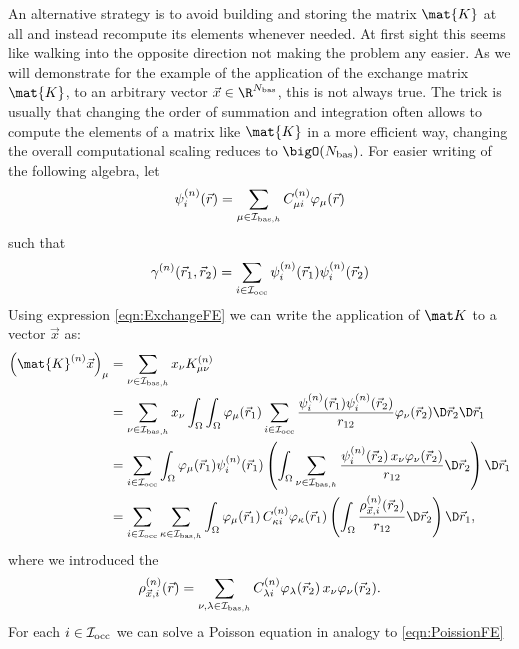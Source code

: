 An alternative strategy
is to avoid building and storing the matrix $\mat{K}$ at all
and instead recompute its elements whenever needed.
At first sight this seems like walking into the opposite direction
not making the problem any easier.
As we will demonstrate for the example
of the application of the exchange matrix $\mat{K}$,
to an arbitrary vector $\vec{x} \in \R^{\Nbas}$,
this is not always true.
The trick is usually that changing the order of summation and integration
often allows to compute the elements of a matrix like $\mat{K}$
in a more efficient way,
changing the overall computational scaling reduces to $\bigO(\Nbas)$.
For easier writing of the following algebra, let
\[ \psi_i^{(n)}(\vec{r}) = \sum_{\mu\in\mathcal{I}_{\text{bas},h}} C^{(n)}_{\mu i} \varphi_\mu(\vec{r}) \]
such that
\[
	\gamma^{(n)}(\vec{r}_1, \vec{r}_2)
	= \sum_{i\in\mathcal{I}_\text{occ}} \psi_i^{(n)}(\vec{r}_1) \psi_i^{(n)}(\vec{r}_2)
\]
Using expression \eqref{eqn:ExchangeFE} we can write
the application of $\matK$ to a vector $\vec{x}$ as:
\begin{equation}
\label{eqn:ExchangeApply}
\begin{aligned}
	\left( \mat{K}^{(n)} \vec{x}  \right)_\mu
	&= \sum_{\nu\in\Ibash} x_\nu K^{(n)}_{\mu\nu} \\
	&= \sum_{\nu\in\Ibash}
		x_\nu
		\int_\Omega \int_\Omega
		\varphi_\mu(\vec{r}_1)
		\sum_{i\in\Iocc}
		\frac{
			\psi_i^{(n)}(\vec{r}_1) \psi_i^{(n)}(\vec{r}_2)
		}{r_{12}}
		\varphi_\nu(\vec{r}_2) \D \vec{r}_2 \D \vec{r}_1 \\
	&= \sum_{i\in\Iocc}
		\int_\Omega
		\varphi_\mu(\vec{r}_1) \psi_i^{(n)}(\vec{r}_1)
		\left(
		\int_\Omega
		\sum_{\nu\in\Ibash}
			\frac{\psi_i^{(n)}(\vec{r}_2) \, x_\nu \varphi_\nu(\vec{r}_2)}
			{r_{12}}
		\D \vec{r}_2
		\right) \D \vec{r}_1 \\
	&= \sum_{i\in\Iocc} \sum_{\kappa\in\Ibash}
		\int_\Omega
			\varphi_\mu(\vec{r}_1) \, C^{(n)}_{\kappa i} \varphi_\kappa(\vec{r}_1)
		\left(
		\int_\Omega \frac{\rho_{\vec{x},i}^{(n)}(\vec{r}_2)}{r_{12}} \D \vec{r}_2
		\right) \D \vec{r}_1,
\end{aligned}
\end{equation}
where we introduced the 
\begin{equation}
	\label{eqn:ExchangeContrDens}
	\rho_{\vec{x},i}^{(n)}(\vec{r}) = \sum_{\nu,\lambda\in\mathcal{I}_{\text{bas},h}}
	C^{(n)}_{\lambda i} \varphi_\lambda(\vec{r}_2) \, x_\nu \varphi_\nu(\vec{r}_2).
\end{equation}
For each $i\in\mathcal{I}_\text{occ}$ we can solve a Poisson equation in analogy to \eqref{eqn:PoissionFE}
